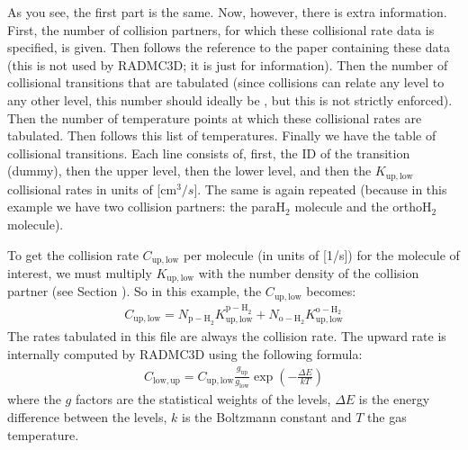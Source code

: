 \documentclass[letterpaper,10pt,english]{sphinxmanual}
\begin{document}
As you see, the first part is the same. Now, however, there is extra
information.  First, the number of collision partners, for which these
collisional rate data is specified, is given. Then follows the reference to the
paper containing these data (this is not used by RADMC\sphinxhyphen{}3D; it is just for
information). Then the number of collisional transitions that are tabulated
(since collisions can relate any level to any other level, this number should
ideally be , but this is not strictly enforced). Then
the number of temperature points at which these collisional rates are
tabulated. Then follows this list of temperatures.  Finally we have the table of
collisional transitions. Each line consists of, first, the ID of the transition
(dummy), then the upper level, then the lower level, and then the
\(K_{\mathrm{up,low}}\) collisional rates in units of {[}\(\mathrm{cm}^3/s\){]}. The
same is again repeated (because in this example we have two collision partners:
the para\sphinxhyphen{}H\(_2\) molecule and the ortho\sphinxhyphen{}H\(_2\) molecule).

To get the collision rate \(C_{\mathrm{up,low}}\) per molecule (in units of
{[}1/s{]}) for the molecule of interest, we must multiply
\(K_{\mathrm{up,low}}\) with the number density of the collision partner
(see Section {\hyperref[\detokenize{lineradtrans:sec-collpartner}]{}}).  So in this example, the
\(C_{\mathrm{up,low}}\) becomes:
\begin{equation*}
\begin{split}C_{\mathrm{up,low}} = N_{\mathrm{p-H}_2}K^{\mathrm{p-H}_2}_{\mathrm{up,low}}
+ N_{\mathrm{o-H}_2}K^{\mathrm{o-H}_2}_{\mathrm{up,low}}\end{split}
\end{equation*}
The rates tabulated in this file are always the  collision rate. The
upward rate is internally computed by RADMC\sphinxhyphen{}3D using the following formula:
\begin{equation*}
\begin{split}C_{\mathrm{low,up}} = C_{\mathrm{up,low}} \frac{g_{\mathrm{up}}}{g_{\mathrm{low}}}
\exp\left(-\frac{\Delta E}{kT}\right)\end{split}
\end{equation*}
where the \(g\) factors are the statistical weights of the levels,
\(\Delta E\) is the energy difference between the levels, \(k\) is the
Boltzmann constant and \(T\) the gas temperature.
\end{document}
